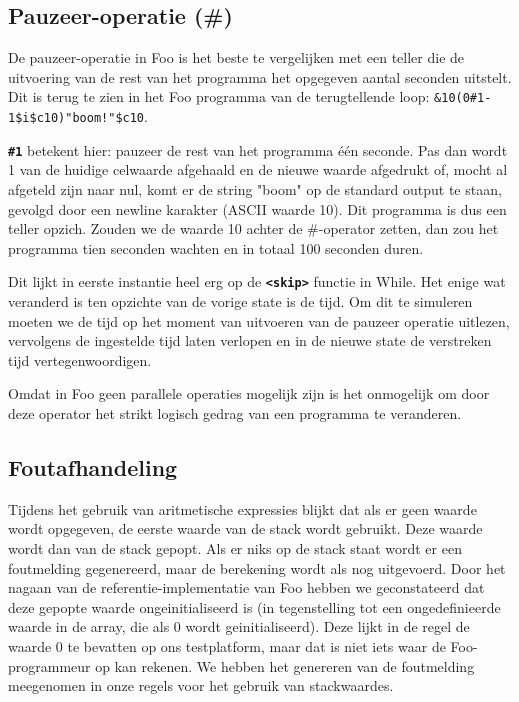 \documentclass[11pt]{article}
\begin{document}
\subsection{Pauzeer-operatie (\#)}
De pauzeer-operatie in Foo is het beste te vergelijken met een teller die de uitvoering van de rest van het programma het opgegeven aantal seconden uitstelt. 
Dit is terug te zien in het Foo programma van de terugtellende loop: \verb|&10(0#1-1$i$c10)"boom!"$c10|.

{\bf \verb|#1|} betekent hier: pauzeer de rest van het programma \'e\'en seconde. 
Pas dan wordt 1 van de huidige celwaarde afgehaald en de nieuwe waarde afgedrukt of, mocht al afgeteld zijn naar nul, komt er de string "boom" op de standard output te staan, gevolgd door een newline karakter (ASCII waarde 10).
Dit programma is dus een teller opzich.
Zouden we de waarde 10 achter de \#-operator zetten, dan zou het programma tien seconden wachten en in totaal 100 seconden duren.


Dit lijkt in eerste instantie heel erg op de {\bf\verb|<skip>|} functie in While.
Het enige wat veranderd is ten opzichte van de vorige state is de tijd.
Om dit te simuleren moeten we de tijd op het moment van uitvoeren van de pauzeer operatie uitlezen, vervolgens de ingestelde tijd laten verlopen en in de nieuwe state de verstreken tijd vertegenwoordigen.

Omdat in Foo geen parallele operaties mogelijk zijn is het onmogelijk om door deze operator het strikt logisch gedrag van een programma te veranderen.

\subsection{Foutafhandeling} %

Tijdens het gebruik van aritmetische expressies blijkt dat als er geen waarde wordt opgegeven, de eerste waarde van de stack wordt gebruikt. 
Deze waarde wordt dan van de stack gepopt. 
Als er niks op de stack staat wordt er een foutmelding gegenereerd, maar de berekening wordt als nog uitgevoerd. %
Door het nagaan van de referentie-implementatie van Foo hebben we geconstateerd dat deze gepopte waarde ongeinitialiseerd is (in tegenstelling tot een ongedefinieerde waarde in de array, die als 0 wordt geinitialiseerd).
Deze lijkt in de regel de waarde 0 te bevatten op ons testplatform, maar dat is niet iets waar de Foo-programmeur op kan rekenen.
We hebben het genereren van de foutmelding meegenomen in onze regels voor het gebruik van stackwaardes.
\end{document}
